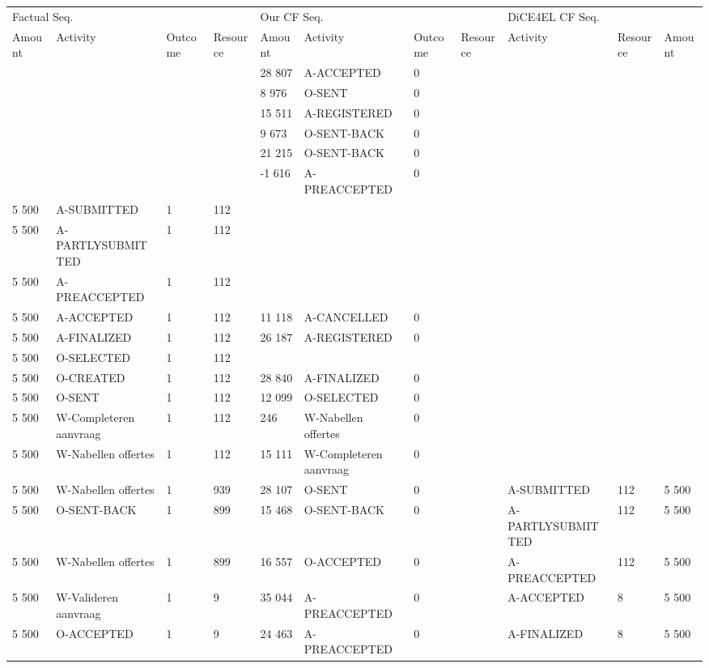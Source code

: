 \begin{tabular}{lllllllllll}
\toprule
\multicolumn{4}{l}{Factual Seq.} & \multicolumn{4}{l}{Our CF Seq.} & \multicolumn{3}{l}{DiCE4EL CF Seq.} \\
Amount & Activity & Outcome & Resource & Amount & Activity & Outcome & Resource & Activity & Resource & Amount \\
\midrule
 &  &  &  & 28 807 & A-ACCEPTED & 0 &  &  &  &  \\
 &  &  &  & 8 976 & O-SENT & 0 &  &  &  &  \\
 &  &  &  & 15 511 & A-REGISTERED & 0 &  &  &  &  \\
 &  &  &  & 9 673 & O-SENT-BACK & 0 &  &  &  &  \\
 &  &  &  & 21 215 & O-SENT-BACK & 0 &  &  &  &  \\
 &  &  &  & -1 616 & A-PREACCEPTED & 0 &  &  &  &  \\
5 500 & A-SUBMITTED & 1 & 112 &  &  &  &  &  &  &  \\
5 500 & A-PARTLYSUBMITTED & 1 & 112 &  &  &  &  &  &  &  \\
5 500 & A-PREACCEPTED & 1 & 112 &  &  &  &  &  &  &  \\
5 500 & A-ACCEPTED & 1 & 112 & 11 118 & A-CANCELLED & 0 &  &  &  &  \\
5 500 & A-FINALIZED & 1 & 112 & 26 187 & A-REGISTERED & 0 &  &  &  &  \\
5 500 & O-SELECTED & 1 & 112 &  &  &  &  &  &  &  \\
5 500 & O-CREATED & 1 & 112 & 28 840 & A-FINALIZED & 0 &  &  &  &  \\
5 500 & O-SENT & 1 & 112 & 12 099 & O-SELECTED & 0 &  &  &  &  \\
5 500 & W-Completeren aanvraag & 1 & 112 & 246 & W-Nabellen offertes & 0 &  &  &  &  \\
5 500 & W-Nabellen offertes & 1 & 112 & 15 111 & W-Completeren aanvraag & 0 &  &  &  &  \\
5 500 & W-Nabellen offertes & 1 & 939 & 28 107 & O-SENT & 0 &  & A-SUBMITTED & 112 & 5 500 \\
5 500 & O-SENT-BACK & 1 & 899 & 15 468 & O-SENT-BACK & 0 &  & A-PARTLYSUBMITTED & 112 & 5 500 \\
5 500 & W-Nabellen offertes & 1 & 899 & 16 557 & O-ACCEPTED & 0 &  & A-PREACCEPTED & 112 & 5 500 \\
5 500 & W-Valideren aanvraag & 1 & 9 & 35 044 & A-PREACCEPTED & 0 &  & A-ACCEPTED & 8 & 5 500 \\
5 500 & O-ACCEPTED & 1 & 9 & 24 463 & A-PREACCEPTED & 0 &  & A-FINALIZED & 8 & 5 500 \\

\end{tabular}
